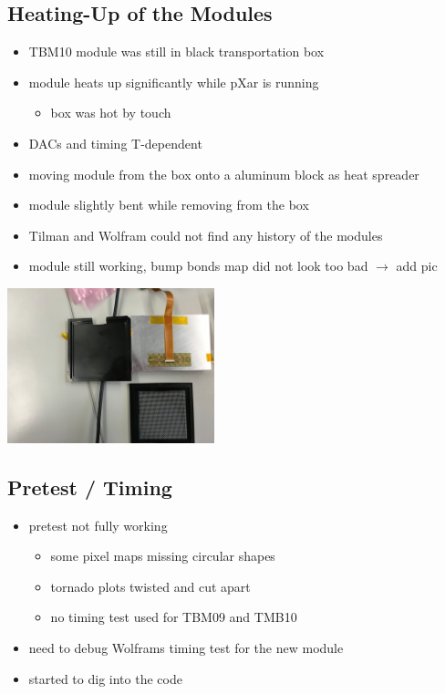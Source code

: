 \documentclass[9pt]{beamer}
\begin{document}
\subsection{Heating-Up of the Modules}
\begin{frame}
	\begin{itemize}
		\setlength{\itemsep}{\fill}
		\item TBM10 module was still in black transportation box
		\item module heats up significantly while pXar is running 
			\begin{itemize}
				\item box was hot by touch
			\end{itemize}
		\item DACs and timing T-dependent
		\item moving module from the box onto a aluminum block as heat spreader
		\item module slightly bent while removing from the box
		\item Tilman and Wolfram could not find any history of the modules
		\item module still working, bump bonds map did not look too bad $\rightarrow$ add pic
		
	\end{itemize}
	\begin{center}
		\includegraphics[width=6cm]{Module}
	\end{center}
\end{frame}
\subsection{Pretest / Timing}
\begin{frame}
	\begin{itemize}
		\setlength{\itemsep}{\fill}
		\item pretest not fully working
		\begin{itemize}
			\item some pixel maps missing circular shapes
			\item tornado plots twisted and cut apart
			\item no timing test used for TBM09 and TMB10
		\end{itemize}
		\item need to debug Wolframs timing test for the new module
		\item started to dig into the code
	\end{itemize}
\end{frame}
\end{document}
